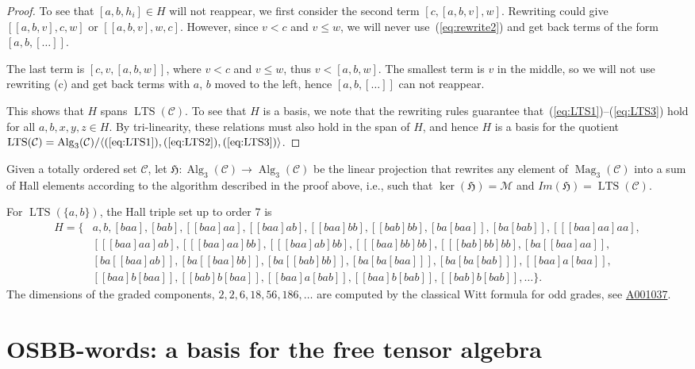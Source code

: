\documentclass[10pt,a4paper]{amsart}
\newcommand{\refp}[1]{(\ref{#1})}
\newcommand*{\LTS}{\operatorname{LTS}}
\newcommand*{\Mag}{\operatorname{Mag}}
\newcommand*{\Alg}{\operatorname{Alg}}
\numberwithin{equation}{section}
\begin{document}
\begin{proof}
To see that $[a,b,h_i]\in H$ will not reappear, we first consider the second term $[c,[a,b,v],w]$. Rewriting could give
$[[a,b,v],c,w]$ or $[[a,b,v],w,c]$. However, since $v<c$ and $v\leq w$, we will never use~\refp{eq:rewrite2} and get back terms of the form $[a,b,[\dots]]$.

The last term is $[c,v,[a,b,w]]$, where $v<c$ and $v\leq w$, thus $v<[a,b,w]$. The smallest term is $v$ in the middle, so we
will not use rewriting (c)
and get back terms with $a$, $b$ moved to the left, hence $[a,b,[\dots]]$ can not reappear.

This shows that $H$ spans $\LTS(\mathcal{C})$. To see that $H$ is a basis, we note that the rewriting rules guarantee that~\refp{eq:LTS1}--\refp{eq:LTS3} hold for all $a,b,x,y,z\in H$. By tri-linearity, these relations must also hold in the span of $H$, and hence $H$ is a basis for the quotient $\LTS(\mathcal{C}) = \Alg_3(\mathcal{C})/\langle \refp{eq:LTS1},\refp{eq:LTS2},\refp{eq:LTS3}\rangle$.
\end{proof}

\begin{Definition}\label{def:Hall_map}
Given a totally ordered set $\mathcal{C}$, let $\mathfrak{H} \colon \Alg_3 (\mathcal{C}) \rightarrow \Alg_3(\mathcal{C})$ be the linear projection that rewrites any element of $\Mag_3(\mathcal{C})$ into a sum of Hall elements according to the algorithm described in the proof above, i.e., such that $\ker(\mathfrak{H}) = \mathcal{M}$ and $Im(\mathfrak{H}) = \LTS(\mathcal{C})$.
\end{Definition}


For $\LTS(\{a,b\})$, the Hall triple set up to order 7 is
\begin{align*}
H = \{{}&a, b,
[baa], [bab],
[[baa]aa], [[baa]ab],
[[baa]bb], [[bab]bb], [ba[baa]],
[ba[bab]],
[[[baa]aa]aa], \\ &{} [[[baa]aa]ab], [[[baa]aa]bb],
[[[baa]ab]bb], [[[baa]bb]bb], [[[bab]bb]bb],
[ba[[baa]aa]], \\ &{}
[ba[[baa]ab]],[ba[[baa]bb]], [ba[[bab]bb]],
[ba[ba[baa]]], [ba[ba[bab]]],
[[baa]a[baa]],
\\ &{}
[[baa]b[baa]],
[[bab]b[baa]], [[baa]a[bab]],
[[baa]b[bab]], [[bab]b[bab]], \dots\} .
\end{align*}
The dimensions of the graded components, $2, 2, 6, 18, 56, 186, \dots$ are computed by the classical Witt formula for odd grades, see \href{https://oeis.org/A001037}{A001037}.




\section{OSBB-words: a basis for the free tensor algebra}\label{sec:OSBB}
\end{document}
